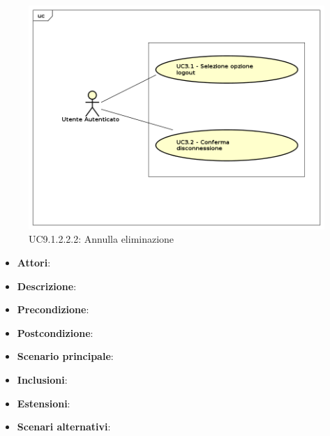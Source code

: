				\label{UC9.1.2.2.2}
				\begin{figure}[h]
					\centering
				\includegraphics[scale=0.7,keepaspectratio]{UML/UC9.png}
					\caption{UC9.1.2.2.2: Annulla eliminazione}
				\end{figure}
				\FloatBarrier
				\begin{itemize}
					\item \textbf{Attori}: 
					\item \textbf{Descrizione}: 
					\item \textbf{Precondizione}: 
					\item \textbf{Postcondizione}: 
					\item \textbf{Scenario principale}:
					\item \textbf{Inclusioni}:
					\item \textbf{Estensioni}:
					\item \textbf{Scenari alternativi}:
				\end{itemize}
				

